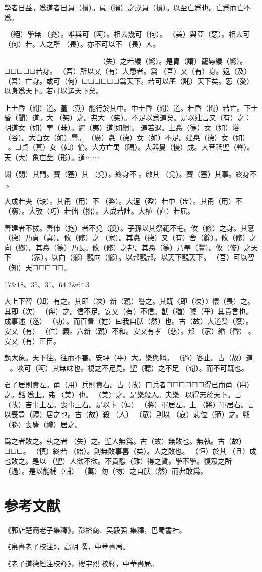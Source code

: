 \documentclass[a4paper]{ctexart}
\begin{document}
    學者日益。爲道者日員（損）。員（損）之或員（損）。以至亡爲也。亡爲而亡不爲。

    󶴐（絕）學無𢝊（憂）。唯與可（呵）。相去幾可（何）。𡵂（美）與亞（惡）。相去可（何）若。人之所𥚸（畏）。亦不可以不𥚸（畏）人。

    𢤲（寵）辱若纓（驚）。貴大患若身。可（何）胃（謂）𢤲（寵）辱。𢤲（寵）爲下也。得之若纓（驚）。󶴡（失）之若纓（驚）。是胃（謂）寵辱纓（驚）。☐☐☐☐☐若身。󼾲（吾）所以又（有）大患者。爲󼾲（吾）又（有）身。﨤（及）󼾲（吾）亡身。或可（何）☐☐☐☐☐☐爲天下。若可以厇（託）天下矣。㤅（愛）以身爲天下。若可以迲天下矣。

    上士昏（聞）道。堇（勤）能行於其中。中士昏（聞）道。若昏（聞）若亡。下士昏（聞）道。大𦬫（笑）之。弗大𦬫（笑）。不足以爲道矣。是以建言又（有）之：明道女（如）孛（昧）。遲（夷）道[如繢]。☐道若退。上惪（德）女（如）浴（谷）。大白女（如）辱。󼧊（廣）惪（德）女（如）不足。建惪（德）女（如）󲳴☐。☐貞（真）女（如）愉。大方亡禺（隅）。大器曼（慢）成。大音祗聖（聲）。天（大）象亡坓（形）。道⋯⋯

    閟（閉）其門。賽（塞）其𨓚（兌）。終身不󼲆。啟其𨓚（兌）。賽（塞）其事。終身不󶵠。

    大成若夬（缺）。其甬（用）不󶵢（弊）。大浧（盈）若中（盅）。其甬（用）不󶵣（窮）。大攷（巧）若㑁（拙）。大成若詘。大植（直）若屈。

    善建者不拔。善伂（抱）者不兌（脫）。子孫以其祭祀不乇。攸（修）之身。其惪（德）乃貞（真）。攸（修）之𧱌（家）。其惪（德）又（有）舍（餘）。攸（修）之向（鄉）。其惪（德）乃長。攸（修）之邦。其惪（德）乃奉（豐）。攸（修）之天下☐☐☐☐☐☐☐𧱌（家）。以向（鄉）觀向（鄉）。以邦觀邦。以天下觀天下。󼾲（吾）可以智（知）天☐☐☐☐☐。

    17\&{}18、35、31、64.2\&{}64.3

    大上下智（知）有之。其即（次）新（親）譽之。其既〈即（次）〉愄（畏）之。其即（次）󶵡（侮）之。信不足。安又（有）不信。猷（猶）唬（乎）其貴言也。成事述（遂）𬒬（功）。而百眚（姓）曰我自肰（然）也。古（故）大道癹（廢）。安又（有）󶴑（仁）義。六新（親）不和。安又有孝𡥝（慈）。邦𧱌（家）緍（昏）☐。安又（有）正臣。

    埶大象。天下往。往而不害。安坪（平）大。樂與餌。󶵨（過）客止。古（故）道☐☐☐。啖可（呵）其無味也。視之不足見。聖（聽）之不足𦖞（聞）。而不可既也。

    君子居則貴左。甬（用）兵則貴右。古（故）曰兵者☐☐☐☐☐☐得已而甬（用）之。銛󶵩爲上。弗󶴴（美）也。󶵪〈美〉之。是樂殺人。夫樂☐☐☐以得志於天下。古（故）吉事上左。喪事上右。是以卞（偏）𨟻（將）軍居左。上𨟻（將）軍居右。言以喪豊（禮）居之也。古（故）殺☐（人）☐（眾）則以𢙇（哀）悲位（蒞）之。戰󼡲（勝）喪豊（禮）居之。

    爲之者敗之。執之者󶴡（失）之。聖人無爲。古（故）無敗也。無執。古（故）☐☐☐。󶴤（慎）終若󶴪（始）。則無敗事喜（矣）。人之敗也。𠄨（恒）於其𠭯（且）成也敗之。是以☐（聖）人欲不欲。不貴戁（難）得之貨。學不學。復眾之所󶴭（過）。是以能㭪（輔）󼧕（萬）勿（物）之自肰（然）而弗敢爲。

    \section*{参考文献}
    《郭店楚簡老子集釋》，彭裕商、吴毅强 集釋，巴蜀書社。

    《帛書老子校注》，高明 撰，中華書局。

    《老子道德經注校釋》，樓宇烈 校釋，中華書局。
\end{document}
